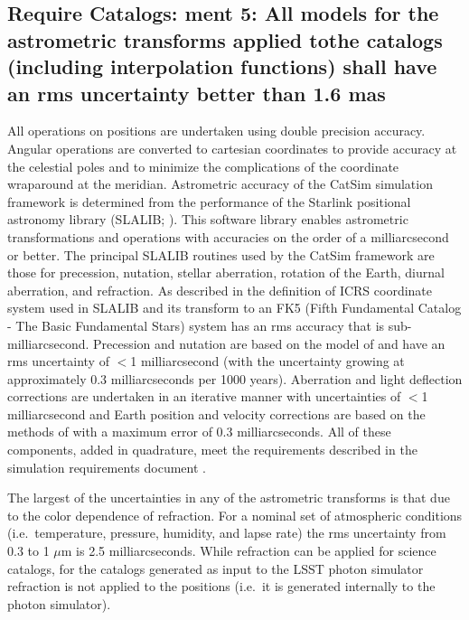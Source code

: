 \documentclass[]{article}
\begin{document}
{\subsection{Require Catalogs: ment 5: All models for the astrometric transforms applied tothe catalogs (including interpolation functions) 
shall have an rms uncertainty better than 1.6 mas}
All operations on positions are undertaken using double precision accuracy. Angular operations are converted to cartesian coordinates to provide accuracy at the celestial poles and to minimize the complications of the coordinate wraparound at the meridian. Astrometric accuracy of the CatSim simulation framework is determined from the performance of the Starlink positional astronomy library (SLALIB; \citet{wallace}). This software library enables astrometric transformations and operations with
accuracies on the order of a milliarcsecond or better.  The principal SLALIB routines used by the CatSim framework are those for precession, nutation, stellar aberration, rotation of the Earth, diurnal aberration, and refraction.  As described in \citet{wallace} the definition of ICRS coordinate system used in SLALIB and its transform to an FK5 (Fifth Fundamental Catalog - The Basic Fundamental Stars) system has an rms accuracy that is sub-milliarcsecond. Precession and nutation are based on the
model of \citet{SF2001} and have an rms uncertainty of $<$1 milliarcsecond (with the uncertainty growing at approximately 0.3 milliarcseconds per 1000 years). Aberration and light deflection corrections are undertaken in an iterative manner with uncertainties of $<$1 milliarcsecond and Earth position and velocity corrections are based on the methods of \citep{stumpff} with a maximum error of 0.3 milliarcseconds. All of these components, added in quadrature, meet the requirements described
in the simulation requirements document \citet{requirements}.

The largest of the uncertainties in any of the astrometric transforms is that due to the color dependence of refraction. For a nominal set of atmospheric conditions (i.e.\ temperature, pressure, humidity, and lapse rate) the rms uncertainty from 0.3 to 1 $\mu$m is 2.5 milliarcseconds. While refraction can be applied for science catalogs, for the catalogs generated as input to the LSST photon simulator refraction is not applied to the positions (i.e.\ it is generated internally to the photon
simulator).
}
\end{document}
